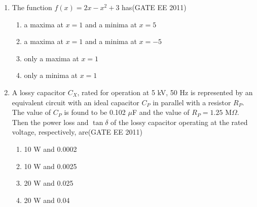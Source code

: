 \documentclass[a4paper,10pt]{exam}
\theoremstyle{remark}
\begin{document}
\begin{enumerate}
Assuming the initial values $x_1=0.0$ and $x_2=1.0$, the Jacobian matrix is\hfill{(GATE EE 2011)}

\begin{multicols}{2}
\begin{enumerate}
\item $\myvec{ 10 & -0.8 \\ 0 & -0.6 }$
\item $\myvec{ 10 & 0 \\ 0 & 10 }$
\item $\myvec{ 0 & -0.8 \\ 10 & -0.6 }$
\item $\myvec{ 10 & 0 \\ 10 & -10 }$
\end{enumerate}
\end{multicols}

\item \quad The function $f(x)=2x-x^2+3$ has\hfill{(GATE EE 2011)}

\begin{multicols}{2}
\begin{enumerate}
\item a maxima at $x=1$ and a minima at $x=5$
\item a maxima at $x=1$ and a minima at $x=-5$
\item only a maxima at $x=1$
\item only a minima at $x=1$
\end{enumerate}
\end{multicols}

\item \quad A lossy capacitor $C_X$, rated for operation at 5 kV, 50 Hz is represented by an equivalent circuit with an ideal capacitor $C_P$ in parallel with a resistor $R_P$. The value of $C_P$ is found to be 0.102 $\mu$F and the value of $R_P=1.25$ M$\Omega$. Then the power loss and $\tan \delta$ of the lossy capacitor operating at the rated voltage, respectively, are\hfill{(GATE EE 2011)}

\begin{multicols}{2}
\begin{enumerate}
\item 10 W and 0.0002
\item 10 W and 0.0025
\item 20 W and 0.025
\item 20 W and 0.04
\end{enumerate}
\end{multicols}


\end{enumerate}
\end{document}
